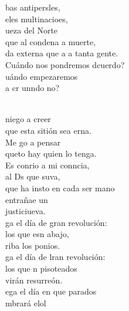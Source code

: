 \begin{cancion}
	bas antipersles,\\
	eles multinacioes,\\
	ueza del Norte\\
	que al  condena a muerte,\\
	da externa que a a tanta gente.\\
	Cuándo nos pondremos dcuerdo?\\
	uándo empezaremos\\
	a cr unndo no?  \\\jump\\
	\begin{chorus}%
	 niego a creer\\
	que esta sitión sea erna.\\
	Me go a pensar \\
	queto hay quien lo tenga.\\
	Es conrio a mi conncia,\\
	al Ds que suva,\\
	que ha insto en cada ser mano\\
	entrañae un\\
	justiciueva.   \\
	ga el día de gran revolución:\\
	los que esn abajo,  \\
	riba los ponios.\\
	ga el día de lran revolución:\\
	los que n pisoteados \\
	virán resurreón.\\
	ega el día en que parados\\
	mbrará elol\\
	\end{chorus}%
	\jump\\
\end{cancion}%
